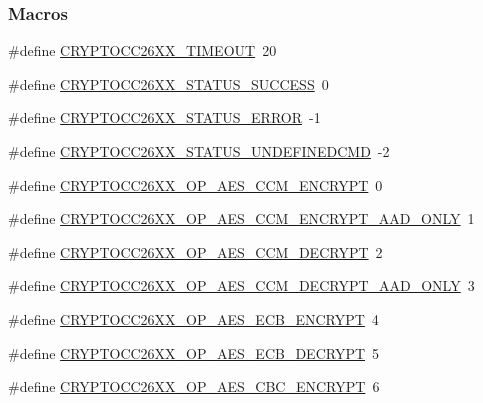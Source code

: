 \subsubsection*{Macros}
\begin{DoxyCompactItemize}
\item 
\#define \hyperlink{_crypto_c_c26_x_x_8h_a8a94999f3768d815e26ac50a0debeeb0}{C\+R\+Y\+P\+T\+O\+C\+C26\+X\+X\+\_\+\+T\+I\+M\+E\+O\+U\+T}~20
\item 
\#define \hyperlink{_crypto_c_c26_x_x_8h_aaebc21d7bb5269638a64ff57f2b758aa}{C\+R\+Y\+P\+T\+O\+C\+C26\+X\+X\+\_\+\+S\+T\+A\+T\+U\+S\+\_\+\+S\+U\+C\+C\+E\+S\+S}~0
\item 
\#define \hyperlink{_crypto_c_c26_x_x_8h_a077508dd42d5999244911edc61f63194}{C\+R\+Y\+P\+T\+O\+C\+C26\+X\+X\+\_\+\+S\+T\+A\+T\+U\+S\+\_\+\+E\+R\+R\+O\+R}~-\/1
\item 
\#define \hyperlink{_crypto_c_c26_x_x_8h_a32adca418e15c3d66ec8a1b3dfa9f4d8}{C\+R\+Y\+P\+T\+O\+C\+C26\+X\+X\+\_\+\+S\+T\+A\+T\+U\+S\+\_\+\+U\+N\+D\+E\+F\+I\+N\+E\+D\+C\+M\+D}~-\/2
\item 
\#define \hyperlink{_crypto_c_c26_x_x_8h_a00bd9c4c4f823576ed52a99cc1c49df4}{C\+R\+Y\+P\+T\+O\+C\+C26\+X\+X\+\_\+\+O\+P\+\_\+\+A\+E\+S\+\_\+\+C\+C\+M\+\_\+\+E\+N\+C\+R\+Y\+P\+T}~0
\item 
\#define \hyperlink{_crypto_c_c26_x_x_8h_adbc0e20b32a3e1b968ea9cb05cd2bde4}{C\+R\+Y\+P\+T\+O\+C\+C26\+X\+X\+\_\+\+O\+P\+\_\+\+A\+E\+S\+\_\+\+C\+C\+M\+\_\+\+E\+N\+C\+R\+Y\+P\+T\+\_\+\+A\+A\+D\+\_\+\+O\+N\+L\+Y}~1
\item 
\#define \hyperlink{_crypto_c_c26_x_x_8h_af57bb0e27a57946d9fa6ac747d534f26}{C\+R\+Y\+P\+T\+O\+C\+C26\+X\+X\+\_\+\+O\+P\+\_\+\+A\+E\+S\+\_\+\+C\+C\+M\+\_\+\+D\+E\+C\+R\+Y\+P\+T}~2
\item 
\#define \hyperlink{_crypto_c_c26_x_x_8h_a2e9761d83b7e451861e3d1891213d069}{C\+R\+Y\+P\+T\+O\+C\+C26\+X\+X\+\_\+\+O\+P\+\_\+\+A\+E\+S\+\_\+\+C\+C\+M\+\_\+\+D\+E\+C\+R\+Y\+P\+T\+\_\+\+A\+A\+D\+\_\+\+O\+N\+L\+Y}~3
\item 
\#define \hyperlink{_crypto_c_c26_x_x_8h_af72980622fb0dc9555587ef90083b3ef}{C\+R\+Y\+P\+T\+O\+C\+C26\+X\+X\+\_\+\+O\+P\+\_\+\+A\+E\+S\+\_\+\+E\+C\+B\+\_\+\+E\+N\+C\+R\+Y\+P\+T}~4
\item 
\#define \hyperlink{_crypto_c_c26_x_x_8h_a74881034cf440f28a91c5263fc728097}{C\+R\+Y\+P\+T\+O\+C\+C26\+X\+X\+\_\+\+O\+P\+\_\+\+A\+E\+S\+\_\+\+E\+C\+B\+\_\+\+D\+E\+C\+R\+Y\+P\+T}~5
\item 
\#define \hyperlink{_crypto_c_c26_x_x_8h_aab1035e549d6de54b25a9f9a6ae2f3ba}{C\+R\+Y\+P\+T\+O\+C\+C26\+X\+X\+\_\+\+O\+P\+\_\+\+A\+E\+S\+\_\+\+C\+B\+C\+\_\+\+E\+N\+C\+R\+Y\+P\+T}~6

\end{DoxyCompactItemize}
